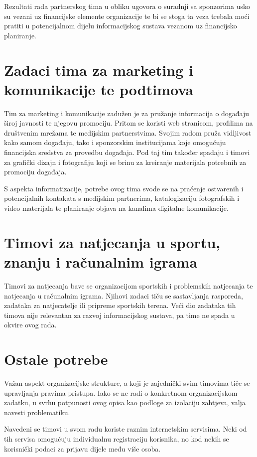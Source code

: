 \documentclass[times, utf8, diplomski]{fer}
\begin{document}
Rezultati rada partnerskog tima u obliku ugovora o suradnji sa sponzorima usko
su vezani uz financijske elemente organizacije te bi se stoga ta veza trebala
moći pratiti u potencijalnom dijelu informacijskog sustava vezanom uz
financijsko planiranje.

\section{Zadaci tima za marketing i komunikacije te podtimova}

Tim za marketing i komunikacije zadužen je za pružanje informacija o događaju
široj javnosti te njegovu promociju. Pritom se koristi web stranicom, profilima
na društvenim mrežama te medijskim partnerstvima. Svojim radom pruža vidljivost
kako samom događaju, tako i sponzorskim institucijama koje omogućuju financijska
sredstva za provedbu događaja. Pod taj tim također spadaju i timovi za grafički
dizajn i fotografiju koji se brinu za kreiranje materijala potrebnih za
promociju događaja.

S aspekta informatizacije, potrebe ovog tima svode se na praćenje ostvarenih i
potencijalnih kontakata s medijskim partnerima, katalogizaciju fotografskih i
video materijala te planiranje objava na kanalima digitalne komunikacije.

\section{Timovi za natjecanja u sportu, znanju i računalnim igrama}

Timovi za natjecanja bave se organizacijom sportskih i problemskih natjecanja te
natjecanja u računalnim igrama. Njihovi zadaci tiču se sastavljanja rasporeda,
zadataka za natjecatelje ili pripreme sportskih terena. Veći dio zadataka tih
timova nije relevantan za razvoj informacijskog sustava, pa time ne spada u
okvire ovog rada.

\section{Ostale potrebe}

Važan aspekt organizacijske strukture, a koji je zajednički svim timovima tiče
se upravljanja pravima pristupa. Iako se ne radi o konkretnom organizacijskom
zadatku, u svrhu potpunosti ovog opisa kao podloge za izolaciju zahtjeva, valja
navesti problematiku.

Navedeni se timovi u svom radu koriste raznim internetskim servisima. Neki od
tih servisa omogućuju individualnu registraciju korisnika, no kod nekih se
korisnički podaci za prijavu dijele među više osoba.
\end{document}
